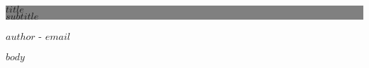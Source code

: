 \documentclass[10pt]{article}
\begin{document}
\thispagestyle{empty}
\pagestyle{empty}

\colorbox{grey}{
  \parbox[t]{1.0\linewidth}{
    \centering \fontsize{30pt}{60pt}\selectfont
    \vspace*{5cm}
    
    \hfill $title$ \\
    \hfill $subtitle$\par
    
    \vspace*{5cm}
  }
}

\vfill

{\centering \large 
\hfill $author$ - $email$}

\clearpage

\begin{addmargin}[6cm]{1cm}
\raggedright
$body$
\end{addmargin}
\end{document}
